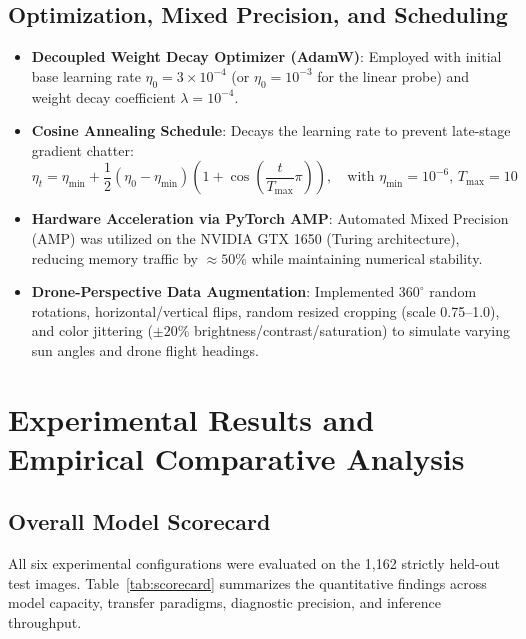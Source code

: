 \documentclass[11pt,a4paper]{article}
\begin{document}
\subsection{Optimization, Mixed Precision, and Scheduling}
\begin{itemize}
    \item \textbf{Decoupled Weight Decay Optimizer (AdamW)}: Employed with initial base learning rate $\eta_0 = 3 \times 10^{-4}$ (or $\eta_0 = 10^{-3}$ for the linear probe) and weight decay coefficient $\lambda = 10^{-4}$.
    \item \textbf{Cosine Annealing Schedule}: Decays the learning rate to prevent late-stage gradient chatter:
    \begin{equation}
        \eta_t = \eta_{\min} + \frac{1}{2}(\eta_0 - \eta_{\min})\left(1 + \cos\left(\frac{t}{T_{\max}}\pi\right)\right), \quad \text{with } \eta_{\min} = 10^{-6}, \, T_{\max} = 10
    \end{equation}
    \item \textbf{Hardware Acceleration via PyTorch AMP}: Automated Mixed Precision (AMP) was utilized on the NVIDIA GTX 1650 (Turing architecture), reducing memory traffic by $\approx 50\%$ while maintaining numerical stability.
    \item \textbf{Drone-Perspective Data Augmentation}: Implemented $360^\circ$ random rotations, horizontal/vertical flips, random resized cropping (scale 0.75--1.0), and color jittering ($\pm 20\%$ brightness/contrast/saturation) to simulate varying sun angles and drone flight headings.
\end{itemize}

\section{Experimental Results and Empirical Comparative Analysis}

\subsection{Overall Model Scorecard}
All six experimental configurations were evaluated on the 1,162 strictly held-out test images. Table~\ref{tab:scorecard} summarizes the quantitative findings across model capacity, transfer paradigms, diagnostic precision, and inference throughput.
\end{document}
